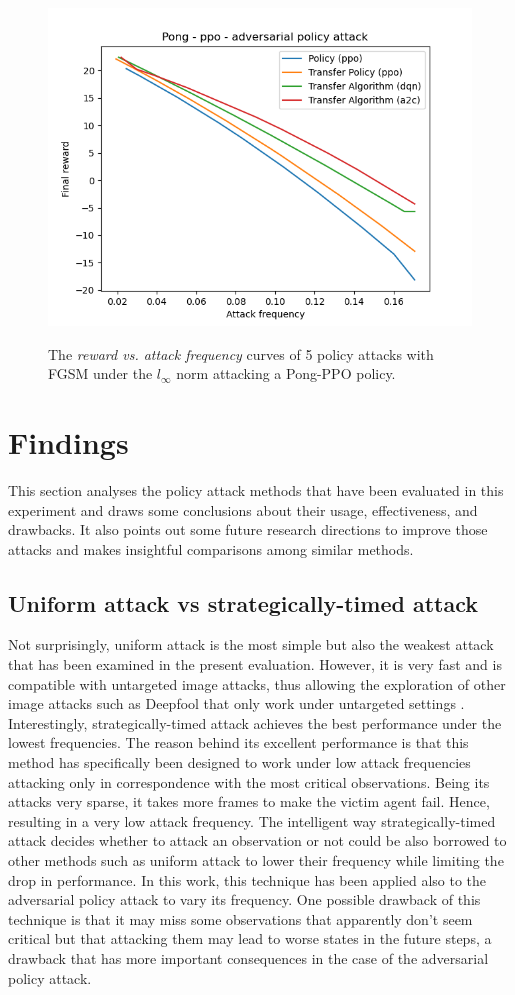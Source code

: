 \begin{figure}
    {\includegraphics[width=0.49\linewidth]{images/exp1/ppo-pong-adversarial_policy.png}}
  \caption{The {\it reward vs. attack frequency} curves of 5 policy attacks with FGSM under the \(l_\infty\) norm attacking a Pong-PPO policy.}
  \label{figure:pong-ppo}
\end{figure}

\section{Findings}
This section analyses the policy attack methods that have been evaluated in this experiment and draws some conclusions about their usage, effectiveness, and drawbacks. It also points out some future research directions to improve those attacks and makes insightful comparisons among similar methods.

\subsection{Uniform attack vs strategically-timed attack}
Not surprisingly, uniform attack is the most simple but also the weakest attack that has been examined in the present evaluation. However, it is very fast and is compatible with untargeted image attacks, thus allowing the exploration of other image attacks such as Deepfool that only work under untargeted settings \cite{moosavidezfooli2016deepfool}. Interestingly, strategically-timed attack achieves the best performance under the lowest frequencies. The reason behind its excellent performance is that this method has specifically been designed to work under low attack frequencies attacking only in correspondence with the most critical observations. Being its attacks very sparse, it takes more frames to make the victim agent fail. Hence, resulting in a very low attack frequency. The intelligent way strategically-timed attack decides whether to attack an observation or not could be also borrowed to other methods such as uniform attack to lower their frequency while limiting the drop in performance. In this work, this technique has been applied also to the adversarial policy attack to vary its frequency. One possible drawback of this technique is that it may miss some observations that apparently don't seem critical but that attacking them may lead to worse states in the future steps, a drawback that has more important consequences in the case of the adversarial policy attack.

